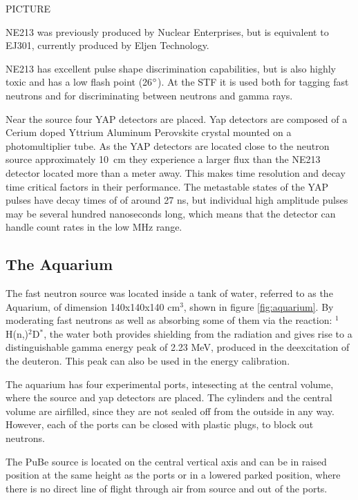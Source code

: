 \documentclass[main.tex]{subfiles}
\begin{document}
PICTURE

NE213 was previously produced by Nuclear Enterprises, but is equivalent to EJ301, currently produced by Eljen Technology. 

NE213 has excellent pulse shape discrimination capabilities, but is also highly toxic and has a low flash point (26$\text{\degree}$). At the STF it is used both for tagging fast neutrons and for discriminating between neutrons and gamma rays. 

Near the source four YAP detectors are placed. Yap detectors are composed of a Cerium doped Yttrium Aluminum Perovskite crystal mounted on a photomultiplier tube. As the YAP detectors are located close to the neutron source approximately \si{10\cm} they experience a larger flux than the NE213 detector located more than a meter away. This makes time resolution and decay time critical factors in their performance. The metastable states of the YAP pulses have decay times of of around 27 ns, but individual high amplitude pulses may be several hundred nanoseconds long, which means that the detector can handle count rates in the low MHz range.

\subsection{The Aquarium}
The fast neutron source was located inside a tank of water, referred to as the Aquarium, of dimension 140x140x140 \si{\cm}${}^\text{3}$, shown in figure \ref{fig:aquarium}. By moderating fast neutrons as well as absorbing some of them via the reaction: $^{\text{1}}$H(n,\textgamma)$^{\text{2}}$D$^*$, the water both provides shielding from the radiation and gives rise to a distinguishable gamma energy peak of 2.23 MeV, produced in the deexcitation of the deuteron. This peak can also be used in the energy calibration.

The aquarium has four experimental ports, intesecting at the central volume, where the source and yap detectors are placed. The cylinders and the central volume are airfilled, since they are not sealed off from the outside in any way. However, each of the ports can be closed with plastic plugs, to block out neutrons.

The PuBe source is located on the central vertical axis and can be in raised position at the same height as the ports or in a lowered parked position, where there is no direct line of flight through air from source and out of the ports.
\end{document}
